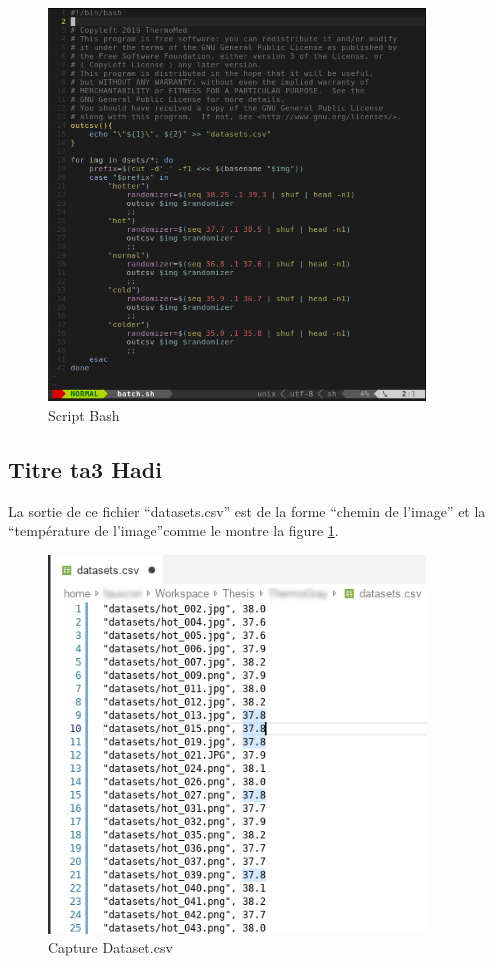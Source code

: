 \documentclass[12pt]{article}
\begin{document}
\begin{figure}[h]
	\centering
	\includegraphics[width=10cm]{img-Chapiter-4/batch.png}
	\caption{Script Bash}
\end{figure}

\subsection*{Titre ta3 Hadi}
La sortie de ce fichier “datasets.csv” est de la forme “chemin de l’image” et la “température de l’image”comme le montre la figure  \ref{fig:dataset.csv}.

\begin{figure}[h]
	\centering
	\includegraphics[width=10cm]{img-Chapiter-4/datasets.png}
	\caption{Capture Dataset.csv}
	\label{fig:dataset.csv}
\end{figure}
\end{document}
